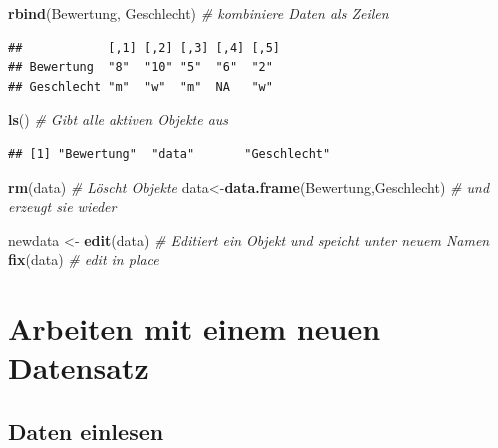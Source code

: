 \documentclass[10pt,ngerman,onside]{article}
\newenvironment{Shaded}{\begin{snugshade}}{\end{snugshade}}
\newcommand{\KeywordTok}[1]{\textcolor[rgb]{0.13,0.29,0.53}{\textbf{#1}}}
\newcommand{\StringTok}[1]{\textcolor[rgb]{0.31,0.60,0.02}{#1}}
\newcommand{\CommentTok}[1]{\textcolor[rgb]{0.56,0.35,0.01}{\textit{#1}}}
\newcommand{\NormalTok}[1]{#1}
\begin{document}
\begin{Shaded}
\begin{Highlighting}[]
\KeywordTok{rbind}\NormalTok{(Bewertung, Geschlecht) }\CommentTok{# kombiniere Daten als Zeilen}
\end{Highlighting}
\end{Shaded}

\begin{verbatim}
##            [,1] [,2] [,3] [,4] [,5]
## Bewertung  "8"  "10" "5"  "6"  "2" 
## Geschlecht "m"  "w"  "m"  NA   "w"
\end{verbatim}

\begin{Shaded}
\begin{Highlighting}[]
\KeywordTok{ls}\NormalTok{()     }\CommentTok{# Gibt alle aktiven Objekte aus}
\end{Highlighting}
\end{Shaded}

\begin{verbatim}
## [1] "Bewertung"  "data"       "Geschlecht"
\end{verbatim}

\begin{Shaded}
\begin{Highlighting}[]
\KeywordTok{rm}\NormalTok{(data) }\CommentTok{# Löscht Objekte}
\NormalTok{data<-}\KeywordTok{data.frame}\NormalTok{(Bewertung,Geschlecht) }\CommentTok{# und erzeugt sie wieder}
\end{Highlighting}
\end{Shaded}

\begin{Shaded}
\begin{Highlighting}[]
\NormalTok{newdata <-}\StringTok{ }\KeywordTok{edit}\NormalTok{(data)   }\CommentTok{# Editiert ein Objekt und speicht unter neuem Namen}
\KeywordTok{fix}\NormalTok{(data)               }\CommentTok{# edit in place}
\end{Highlighting}
\end{Shaded}

\hypertarget{arbeiten-mit-einem-neuen-datensatz}{%
\section{Arbeiten mit einem neuen
Datensatz}\label{arbeiten-mit-einem-neuen-datensatz}}

\hypertarget{daten-einlesen}{%
\subsection{Daten einlesen}\label{daten-einlesen}}
\end{document}
